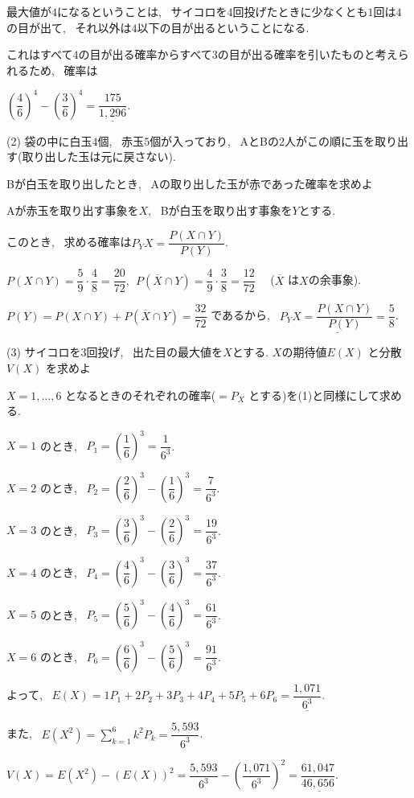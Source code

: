 \documentclass[dvipdfmx]{jsarticle}
\begin{document}
\bigskip

最大値が$4$になるということは, \ サイコロを$4$回投げたときに少なくとも$1$回は$4$の目が出て, \ それ以外は$4$以下の目が出るということになる.

これはすべて$4$の目が出る確率からすべて$3$の目が出る確率を引いたものと考えられるため, \ 確率は

$\left(\dfrac{4}{6} \right)^4 - \left(\dfrac{3}{6} \right)^4
= \underline{\dfrac{175}{1{,}296}}$.

\bigskip
\bigskip

(2) 袋の中に白玉$4$個, \ 赤玉$5$個が入っており, \ AとBの2人がこの順に玉を取り出す(取り出した玉は元に戻さない).

Bが白玉を取り出したとき, \ Aの取り出した玉が赤であった確率を求めよ

\bigskip

Aが赤玉を取り出す事象を$X$, \ Bが白玉を取り出す事象を$Y$とする.

このとき, \ 求める確率は$P_Y X = \dfrac{P(X \cap Y)}{P(Y)}$.

$P(X \cap Y) = \dfrac{5}{9} \cdot \dfrac{4}{8} = \dfrac{20}{72}, \ \ 
P(\overline{X} \cap Y) = \dfrac{4}{9} \cdot \dfrac{3}{8} = \dfrac{12}{72}$ \ \ ($\overline{X}$ は$X$の余事象).

$P(Y) = P(X \cap Y) + P(\overline{X} \cap Y) = \dfrac{32}{72}$ であるから, \ $\underline{P_Y X = \dfrac{P(X \cap Y)}{P(Y)} = \dfrac{5}{8}}$.

\bigskip
\bigskip

(3) サイコロを$3$回投げ, \ 出た目の最大値を$X$とする. $X$の期待値$E(X)$ と分散$V(X)$ を求めよ

\bigskip

$X = 1, ..., 6$ となるときのそれぞれの確率($=P_X$ とする)を(1)と同様にして求める.

$X = 1$ のとき, \ $P_1 = \left(\dfrac{1}{6} \right)^3 = \dfrac{1}{6^3}$.

$X = 2$ のとき, \ $P_2 = \left(\dfrac{2}{6} \right)^3 - \left(\dfrac{1}{6} \right)^3 = \dfrac{7}{6^3}$.

$X = 3$ のとき, \ $P_3 = \left(\dfrac{3}{6} \right)^3 - \left(\dfrac{2}{6} \right)^3 = \dfrac{19}{6^3}$.

$X = 4$ のとき, \ $P_4 = \left(\dfrac{4}{6} \right)^3 - \left(\dfrac{3}{6} \right)^3 = \dfrac{37}{6^3}$.

$X = 5$ のとき, \ $P_5 = \left(\dfrac{5}{6} \right)^3 - \left(\dfrac{4}{6} \right)^3 = \dfrac{61}{6^3}$.

$X = 6$ のとき, \ $P_6 = \left(\dfrac{6}{6} \right)^3 - \left(\dfrac{5}{6} \right)^3 = \dfrac{91}{6^3}$.

よって, \ $E(X) = 1P_1 + 2P_2 + 3P_3 + 4P_4 + 5P_5 + 6P_6 = \underline{\dfrac{1{,}071}{6^3}}$.

また, \ $E(X^2) = \displaystyle \sum_{k=1}^6 k^2 P_k
= \dfrac{5{,}593}{6^3}$.

$V(X) = E(X^2) - (E(X))^2 = \dfrac{5{,}593}{6^3} - \left(\dfrac{1{,}071}{6^3} \right)^2 = \underline{\dfrac{61{,}047}{46{,}656}.}$
\end{document}
